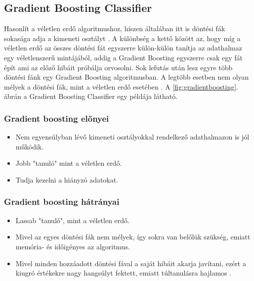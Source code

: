\subsection{Gradient Boosting Classifier}
Hasonlít a véletlen erdő algoritmushoz, hiszen általában itt is döntési fák sokasága adja a kimeneti osztályt \cite{gradient_boosting_1}. A különbség a kettő között az, hogy míg a véletlen erdő az összes döntési fát egyszerre külön-külön tanítja az adathalmaz egy véletlenszerű mintájából, addig a Gradient Boosting egyszerre csak egy fát épít ami az előző hibáit próbálja orvosolni. Sok lefutás után lesz egyre több döntési fánk egy Gradient Boosting algoritmusban. A legtöbb esetben nem olyan mélyek a döntési fák, mint a véletlen erdő esetében \cite{gradient_boosting_2}. A \ref{fig:gradientboosting}. ábrán a Gradient Boosting Classifier egy példája látható.

\subsubsection{Gradient boosting előnyei}
\begin{itemize}
    \item Nem egyensúlyban lévő kimeneti osztályokkal rendelkező adathalmazon is jól működik.
    \item Jobb "tanuló" mint a véletlen erdő.
    \item Tudja kezelni a hiányzó adatokat.
\end{itemize}


\subsubsection{Gradient boosting hátrányai}
\begin{itemize}
    \item Lassab "tanuló", mint a véletlen erdő.
    \item Mivel az egyes döntési fák nem mélyek, így sokra van belőlük szükség, emiatt memória- és időigényes az algoritmus.
    \item Mivel minden hozzáadott döntési fával a saját hibáit akarja javítani, ezért a kiugró értékekre nagy hangsúlyt fektett, emiatt túltanulásra hajlamos \cite{gradient_boosting_2}.
\end{itemize}

